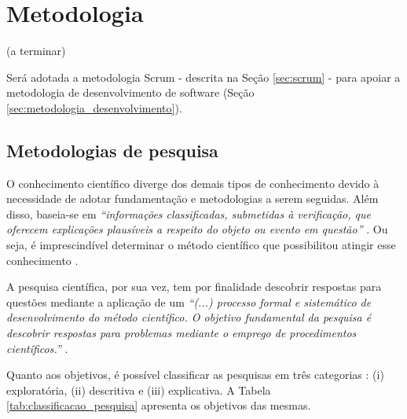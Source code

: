 \chapter[Metodologia]{Metodologia}

(a terminar)


Será adotada a metodologia Scrum - descrita na Seção \ref{sec:scrum} - para apoiar a metodologia de desenvolvimento de software (Seção \ref{sec:metodologia_desenvolvimento}).

\section{Metodologias de pesquisa}

O conhecimento científico diverge dos demais tipos de conhecimento devido à necessidade de adotar fundamentação e metodologias a serem seguidas. Além disso, baseia-se em \textit{“informações classificadas, submetidas à verificação, que oferecem explicações plausíveis a respeito do objeto ou evento em questão”} \cite[pág. 22]{prodanov2013}. Ou seja, é imprescindível determinar o método científico que possibilitou atingir esse conhecimento \cite[pág. 24]{prodanov2013}. 

A pesquisa científica, por sua vez, tem por finalidade descobrir respostas para questões mediante a aplicação de um \textit{“(...) processo formal e sistemático de desenvolvimento do método científico. O objetivo fundamental da pesquisa é descobrir respostas para problemas mediante o emprego de procedimentos científicos.”}  \cite[pág. 26]{gil2008}.

Quanto aos objetivos, é possível classificar as pesquisas em três categorias \cite[pág. 41]{gil2002}: (i) exploratória, (ii) descritiva e (iii) explicativa. A Tabela \ref{tab:classificacao_pesquisa} apresenta os objetivos das mesmas.

